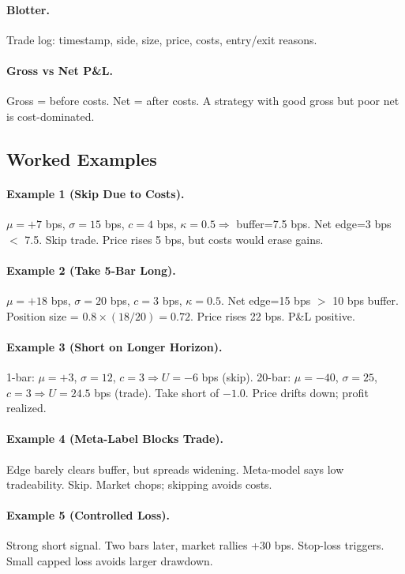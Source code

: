 \documentclass[11pt]{article}
\begin{document}
    \paragraph{Blotter.}
    Trade log: timestamp, side, size, price, costs, entry/exit reasons.

    \paragraph{Gross vs Net P\&L.}
    Gross = before costs. Net = after costs. A strategy with good gross but poor net is cost-dominated.

    \subsection{Worked Examples}

    \paragraph{Example 1 (Skip Due to Costs).}
    $\mu=+7$ bps, $\sigma=15$ bps, $c=4$ bps, $\kappa=0.5 \Rightarrow$ buffer=7.5 bps. Net edge=3 bps $<$ 7.5. Skip trade. Price rises 5 bps, but costs would erase gains.

    \paragraph{Example 2 (Take 5-Bar Long).}
    $\mu=+18$ bps, $\sigma=20$ bps, $c=3$ bps, $\kappa=0.5$. Net edge=15 bps $>$ 10 bps buffer. Position size = $0.8 \times (18/20)=0.72$. Price rises 22 bps. P\&L positive.

    \paragraph{Example 3 (Short on Longer Horizon).}
    1-bar: $\mu=+3$, $\sigma=12$, $c=3 \Rightarrow U=-6$ bps (skip).
    20-bar: $\mu=-40$, $\sigma=25$, $c=3 \Rightarrow U=24.5$ bps (trade).
    Take short of $-1.0$. Price drifts down; profit realized.

    \paragraph{Example 4 (Meta-Label Blocks Trade).}
    Edge barely clears buffer, but spreads widening. Meta-model says low tradeability. Skip. Market chops; skipping avoids costs.

    \paragraph{Example 5 (Controlled Loss).}
    Strong short signal. Two bars later, market rallies +30 bps. Stop-loss triggers. Small capped loss avoids larger drawdown.
\end{document}
